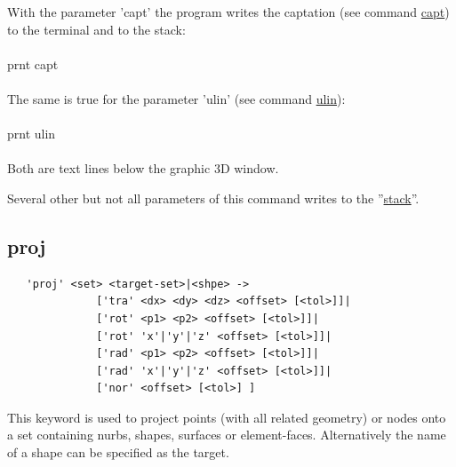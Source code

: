 \documentclass{article}
\providecommand{\htmlref}[2]{\hyperref[#2]{#1}}
\begin{document}
With the parameter 'capt' the program writes the captation (see command \htmlref{capt}{capt}) to the terminal and to the stack: \\\\prnt capt\\\\The same is true for the parameter 'ulin' (see command \htmlref{ulin}{ulin}): \\\\prnt ulin\\\\ Both are text lines below the graphic 3D window.

Several other but not all parameters of this command writes to the ''\htmlref{stack}{stack}''.


\subsection{\label{proj}proj}
\begin{verbatim}
   'proj' <set> <target-set>|<shpe> ->
              ['tra' <dx> <dy> <dz> <offset> [<tol>]]|
              ['rot' <p1> <p2> <offset> [<tol>]]|
              ['rot' 'x'|'y'|'z' <offset> [<tol>]]|
              ['rad' <p1> <p2> <offset> [<tol>]]|
              ['rad' 'x'|'y'|'z' <offset> [<tol>]]|
              ['nor' <offset> [<tol>] ]   
\end{verbatim}
This keyword is used to project points (with all related geometry) or nodes onto a set containing nurbs, shapes, surfaces or element-faces. Alternatively the name of a shape can be specified as the target.
\end{document}
